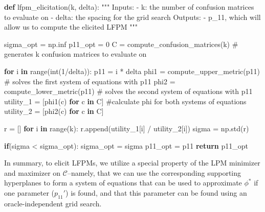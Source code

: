 \documentclass[
  letterpaper,
  numbers=noenddot,
  DIV=11,
  oneside]{scrreprt}
\newenvironment{Shaded}{\begin{snugshade}}{\end{snugshade}}
\newcommand{\BuiltInTok}[1]{\textcolor[rgb]{0.00,0.23,0.31}{#1}}
\newcommand{\CommentTok}[1]{\textcolor[rgb]{0.37,0.37,0.37}{#1}}
\newcommand{\ControlFlowTok}[1]{\textcolor[rgb]{0.00,0.23,0.31}{\textbf{#1}}}
\newcommand{\DecValTok}[1]{\textcolor[rgb]{0.68,0.00,0.00}{#1}}
\newcommand{\KeywordTok}[1]{\textcolor[rgb]{0.00,0.23,0.31}{\textbf{#1}}}
\newcommand{\NormalTok}[1]{\textcolor[rgb]{0.00,0.23,0.31}{#1}}
\newcommand{\OperatorTok}[1]{\textcolor[rgb]{0.37,0.37,0.37}{#1}}
\theoremstyle{remark}
\begin{document}
\begin{Shaded}
\begin{Highlighting}[numbers=left,,]
\KeywordTok{def}\NormalTok{ lfpm\_elicitation(k, delta):}
    \CommentTok{"""}
\CommentTok{    Inputs:}
\CommentTok{    {-} k: the number of confusion matrices to evaluate on}
\CommentTok{    {-} delta: the spacing for the grid search}
\CommentTok{    Outputs:}
\CommentTok{    {-} p\_11\textquotesingle{}, which will allow us to compute the elicited LFPM}
\CommentTok{    """}

\NormalTok{    sigma\_opt }\OperatorTok{=}\NormalTok{ np.inf}
\NormalTok{    p11\_opt }\OperatorTok{=} \DecValTok{0}
\NormalTok{    C }\OperatorTok{=}\NormalTok{ compute\_confusion\_matrices(k) }\CommentTok{\# generates k confusion matrices to evaluate on}

    \ControlFlowTok{for}\NormalTok{ i }\KeywordTok{in} \BuiltInTok{range}\NormalTok{(}\BuiltInTok{int}\NormalTok{(}\DecValTok{1}\OperatorTok{/}\NormalTok{delta)):}
\NormalTok{        p11 }\OperatorTok{=}\NormalTok{ i }\OperatorTok{*}\NormalTok{ delta}
\NormalTok{        phi1 }\OperatorTok{=}\NormalTok{ compute\_upper\_metric(p11) }\CommentTok{\# solves the first system of equations with p11 }
\NormalTok{        phi2 }\OperatorTok{=}\NormalTok{ compute\_lower\_metric(p11) }\CommentTok{\# solves the second system of equations with p11 }
\NormalTok{        utility\_1 }\OperatorTok{=}\NormalTok{ [phi1(c) }\ControlFlowTok{for}\NormalTok{ c }\KeywordTok{in}\NormalTok{ C] }\CommentTok{\#calculate phi for both systems of equations}
\NormalTok{        utility\_2 }\OperatorTok{=}\NormalTok{ [phi2(c) }\ControlFlowTok{for}\NormalTok{ c }\KeywordTok{in}\NormalTok{ C]}

\NormalTok{        r }\OperatorTok{=}\NormalTok{ []}
        \ControlFlowTok{for}\NormalTok{ i }\KeywordTok{in} \BuiltInTok{range}\NormalTok{(k):}
\NormalTok{            r.append(utility\_1[i] }\OperatorTok{/}\NormalTok{ utility\_2[i])}
\NormalTok{        sigma }\OperatorTok{=}\NormalTok{ np.std(r)}

        \ControlFlowTok{if}\NormalTok{(sigma }\OperatorTok{\textless{}}\NormalTok{ sigma\_opt):}
\NormalTok{            sigma\_opt }\OperatorTok{=}\NormalTok{ sigma}
\NormalTok{            p11\_opt }\OperatorTok{=}\NormalTok{ p11}
    \ControlFlowTok{return}\NormalTok{ p11\_opt}
\end{Highlighting}
\end{Shaded}

In summary, to elicit LFPMs, we utilize a special property of the LPM
minimizer and maximizer on \(\mathcal{C}\)--namely, that we can use the
corresponding supporting hyperplanes to form a system of equations that
can be used to approximate \(\phi^*\) if one parameter (\(p_{11}'\)) is
found, and that this parameter can be found using an oracle-independent
grid search.
\end{document}

